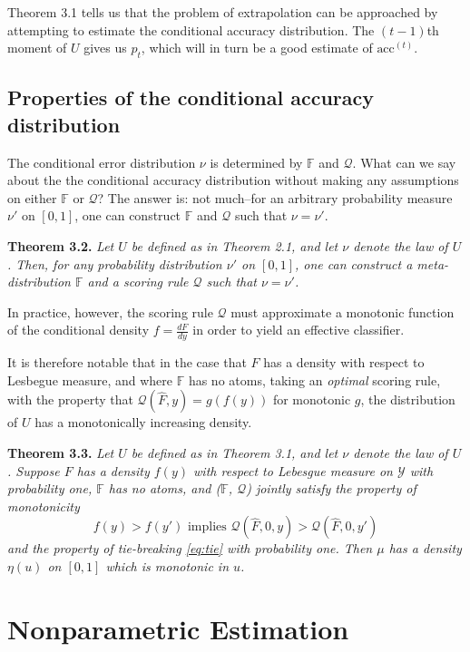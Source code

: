 \documentclass{article}
\begin{document}
Theorem 3.1 tells us that the problem of extrapolation can be
approached by attempting to estimate the conditional accuracy
distribution.  The $(t-1)$th moment of $U$ gives us $p_t$, which will
in turn be a good estimate of $\text{acc}^{(t)}$.

\subsection{Properties of the conditional accuracy distribution}

The conditional error distribution $\nu$ is determined by $\mathbb{F}$
and $\mathcal{Q}$.  What can we say about the the conditional accuracy
distribution without making any assumptions on either $\mathbb{F}$ or
$\mathcal{Q}$?  The answer is: not much--for an arbitrary probability
measure $\nu'$ on $[0,1]$, one can construct $\mathbb{F}$ and
$\mathcal{Q}$ such that $\nu = \nu'$.

\noindent\textbf{Theorem 3.2.} \emph{ Let $U$ be defined as in Theorem
  2.1, and let $\nu$ denote the law of $U$.  Then, for any probability
  distribution $\nu'$ on $[0,1]$, one can construct a
  meta-distribution $\mathbb{F}$ and a scoring rule $\mathcal{Q}$ such
  that $\nu = \nu'$.  }

In practice, however, the scoring rule $\mathcal{Q}$ must approximate
a monotonic function of the conditional density $f = \frac{dF}{dy}$ in order to
yield an effective classifier.

It is therefore notable that in the case that $F$ has a density with
respect to Lesbegue measure, and where $\mathbb{F}$ has no atoms,
taking an \emph{optimal} scoring rule, with the property that
$\mathcal{Q}(\hat{F}, y) = g(f(y))$ for monotonic $g$, the
distribution of $U$ has a monotonically increasing density.

\noindent\textbf{Theorem 3.3.} \emph{ Let $U$ be defined as in Theorem
  3.1, and let $\nu$ denote the law of $U$.  Suppose $F$ has a density
  $f(y)$ with respect to Lebesgue measure on $\mathcal{Y}$ with
  probability one, $\mathbb{F}$ has no atoms, and ($\mathbb{F}$,
  $\mathcal{Q}$) jointly satisfy the property of monotonicity
  \[
  f(y) > f(y') \text{ implies } \mathcal{Q}(\hat{F}, 0, y) > \mathcal{Q}(\hat{F}, 0, y')
  \]
  and the property of tie-breaking \eqref{eq:tie} with probability one.
  Then $\mu$ has a density $\eta(u)$ on $[0, 1]$ which is monotonic in $u$.
}

\section{Nonparametric Estimation}
\end{document}
